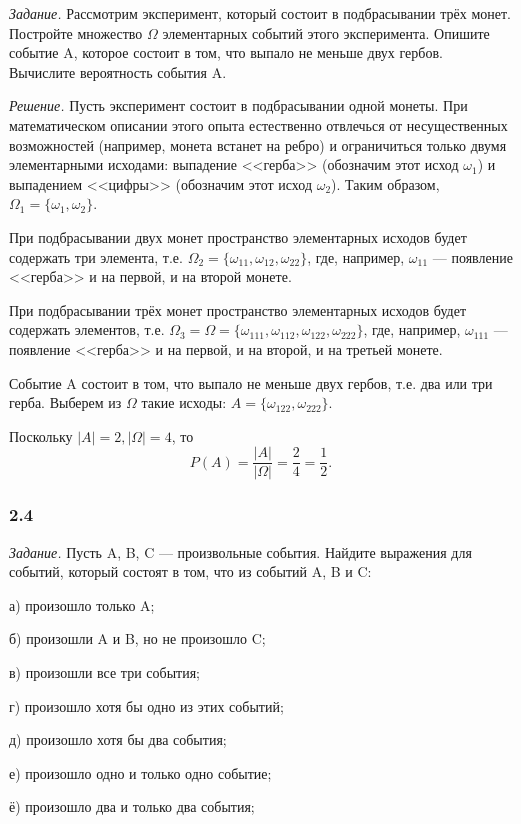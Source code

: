 \documentclass{book}
\begin{document}
\textit{Задание.} Рассмотрим эксперимент, который состоит в подбрасывании трёх монет.
Постройте множество $ \Omega $ элементарных событий этого эксперимента.
Опишите событие A, которое состоит в том, что выпало не меньше двух гербов.
Вычислите вероятность события A.

\textit{Решение.} Пусть эксперимент состоит в подбрасывании одной монеты.
При математическом описании этого опыта естественно отвлечься от несущественных возможностей
(например, монета встанет на ребро) и ограничиться только двумя элементарными исходами:
выпадение <<герба>> (обозначим этот исход $ \omega_1 $) и выпадением <<цифры>> (обозначим этот исход $\omega_2$).
Таким образом, $ \Omega_1 = \{ \omega_1, \omega_2 \} $.

При подбрасывании двух монет пространство элементарных исходов будет содержать три элемента,
т.е. $ \Omega_2 = \{ \omega_{11}, \omega_{12}, \omega_{22} \} $, где, например, $\omega_{11}$ --- появление <<герба>> и на первой, и на второй монете.

При подбрасывании трёх монет пространство элементарных исходов будет содержать элементов, т.е.
$ \Omega_3 = \Omega = \{ \omega_{111}, \omega_{112}, \omega_{122}, \omega_{222} \} $, где, например,
$ \omega_{111} $ --- появление <<герба>> и на первой, и на второй, и на третьей монете.

Событие A состоит в том, что выпало не меньше двух гербов, т.е. два или три герба.
Выберем из $ \Omega $ такие исходы: $ A = \{ \omega_{122}, \omega_{222} \} $.

Поскольку $ |A| = 2, | \Omega | = 4$, то
$$ P(A) = \frac{ |A| }{| \Omega |} =
\frac{2}{4} =
\frac{1}{2}.$$

\subsubsection*{2.4}

\textit{Задание.} Пусть A, B, C --- произвольные события.
Найдите выражения для событий, который состоят в том, что из событий A, B и C:

а) произошло только  A;

б) произошли A и B, но не произошло C;

в) произошли все три события;

г) произошло хотя бы одно из этих событий;

д) произошло хотя бы два события;

е) произошло одно и только одно событие;

ё) произошло два и только два события;
\end{document}
